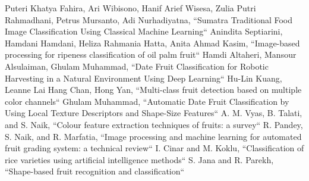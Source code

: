 \documentclass[conference]{IEEEtran}
\begin{document}
\begin{thebibliography}{00}
 Puteri Khatya Fahira, Ari Wibisono, Hanif Arief Wisesa, Zulia Putri Rahmadhani, Petrus Mursanto, Adi Nurhadiyatna, ``Sumatra Traditional Food Image Classification Using Classical Machine Learning``
 Anindita Septiarini, Hamdani Hamdani, Heliza Rahmania Hatta, Anita Ahmad Kasim, ``Image-based processing for ripeness classification of oil palm fruit``
 Hamdi Altaheri, Mansour Alsulaiman, Ghulam Muhammad, ``Date Fruit Classification for Robotic Harvesting in a Natural Environment Using Deep Learning``
 Hu-Lin Kuang, Leanne Lai Hang Chan, Hong Yan, ``Multi-class fruit detection based on multiple color channels``
 Ghulam Muhammad, ``Automatic Date Fruit Classification by Using Local Texture Descriptors and Shape-Size Features``
 A. M. Vyas, B. Talati, and S. Naik, ``Colour feature extraction techniques of fruits: a survey``
 R. Pandey, S. Naik, and R. Marfatia, ``Image processing and machine learning for automated fruit grading system: a technical review``
 I. Cinar and M. Koklu, ``Classification of rice varieties using artificial intelligence methods``
 S. Jana and R. Parekh, ``Shape-based fruit recognition and classification``

\end{thebibliography}
\vspace{12pt}
\end{document}
